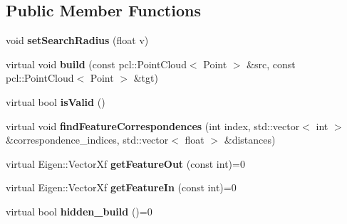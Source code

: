 \subsection*{Public Member Functions}
\begin{DoxyCompactItemize}
\item 
\hypertarget{classFeatureContainerInterface__Euclidean_ae494f98d4348890e446968219fa0378a}{
void {\bfseries setSearchRadius} (float v)}
\label{classFeatureContainerInterface__Euclidean_ae494f98d4348890e446968219fa0378a}

\item 
\hypertarget{classFeatureContainerInterface__Euclidean_a950d53fcc1a629d6a39e43d0dba1bea9}{
virtual void {\bfseries build} (const pcl::PointCloud$<$ Point $>$ \&src, const pcl::PointCloud$<$ Point $>$ \&tgt)}
\label{classFeatureContainerInterface__Euclidean_a950d53fcc1a629d6a39e43d0dba1bea9}

\item 
\hypertarget{classFeatureContainerInterface__Euclidean_a569e4e9d4d5d7fb47121b1817bf91317}{
virtual bool {\bfseries isValid} ()}
\label{classFeatureContainerInterface__Euclidean_a569e4e9d4d5d7fb47121b1817bf91317}

\item 
\hypertarget{classFeatureContainerInterface__Euclidean_a4b5f71d89551a4df0a43daa8ce95e51f}{
virtual void {\bfseries findFeatureCorrespondences} (int index, std::vector$<$ int $>$ \&correspondence\_\-indices, std::vector$<$ float $>$ \&distances)}
\label{classFeatureContainerInterface__Euclidean_a4b5f71d89551a4df0a43daa8ce95e51f}

\item 
\hypertarget{classFeatureContainerInterface__Euclidean_ad4fc430a94ee6c06bc1887e413af4009}{
virtual Eigen::VectorXf {\bfseries getFeatureOut} (const int)=0}
\label{classFeatureContainerInterface__Euclidean_ad4fc430a94ee6c06bc1887e413af4009}

\item 
\hypertarget{classFeatureContainerInterface__Euclidean_a873f51708a90edd5b01de5a86e81cdb0}{
virtual Eigen::VectorXf {\bfseries getFeatureIn} (const int)=0}
\label{classFeatureContainerInterface__Euclidean_a873f51708a90edd5b01de5a86e81cdb0}

\item 
\hypertarget{classFeatureContainerInterface__Euclidean_af8f2128c44deec743d0ede1cc40d83fc}{
virtual bool {\bfseries hidden\_\-build} ()=0}
\label{classFeatureContainerInterface__Euclidean_af8f2128c44deec743d0ede1cc40d83fc}

\end{DoxyCompactItemize}
